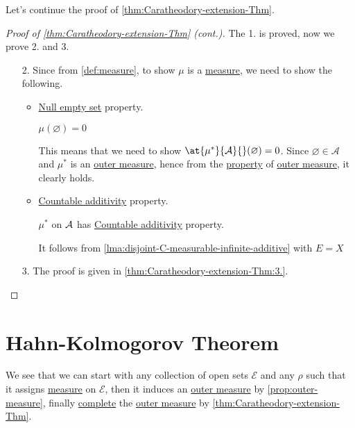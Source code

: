 Let's continue the proof of \autoref{thm:Caratheodory-extension-Thm}.
\begin{proof}[Proof of \autoref{thm:Caratheodory-extension-Thm} (cont.)]\label{pf:Caratheodory-extension-Thm-cont}
	The 1. is proved, now we prove 2. and 3.
	\begin{enumerate}[(1)]
		\item[2.] Since from \autoref{def:measure}, to show \(\mu \) is a \hyperref[def:measure]{measure}, we need to show the following.
			\begin{itemize}
				\item \hyperref[def:measure-null-empty-set]{Null empty set} property.
				      \begin{claim}
					      \(\mu (\varnothing ) = 0\)
				      \end{claim}
				      \begin{explanation}
					      This means that we need to show \(\at{\mu^{\ast} }{\mathcal{A}}{}(\varnothing ) = 0\). Since \(\varnothing \in \mathcal{A} \) and \(\mu^{\ast}\) is
					      an \hyperref[def:outer-measure]{outer measure}, hence from the \hyperref[def:outer-measure-null-empty-set]{property} of \hyperref[def:outer-measure]{outer measure}, it clearly holds.
				      \end{explanation}
				\item \hyperref[def:measure-countable-additivity]{Countable additivity} property.
				      \begin{claim}
					      \(\mu ^{\ast} \) on \(\mathcal{\MakeUppercase{a}} \) has \hyperref[def:measure-countable-additivity]{Countable additivity} property.
				      \end{claim}
				      \begin{explanation}
					      It follows from \autoref{lma:disjoint-C-measurable-infinite-additive} with \(E = X\)
				      \end{explanation}
			\end{itemize}
		\item[3.] The proof is given in \autoref{thm:Caratheodory-extension-Thm:3.}.
	\end{enumerate}
\end{proof}

\section{Hahn-Kolmogorov Theorem}
We see that we can start with any collection of open sets \(\mathcal{E}\) and any \(\rho\) such that it assigns \hyperref[def:measure]{measure} on \(\mathcal{E}\), then it induces an
\hyperref[def:outer-measure]{outer measure} by \autoref{prop:outer-measure}, finally \hyperref[def:complete-measure-space]{complete} the \hyperref[def:outer-measure]{outer measure} by \autoref{thm:Caratheodory-extension-Thm}.

